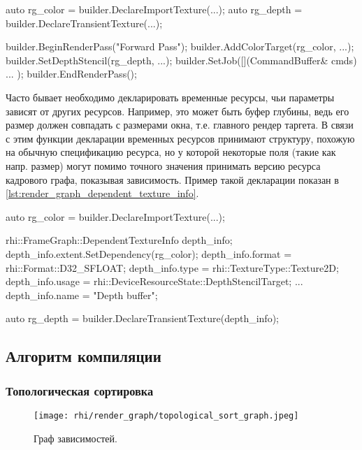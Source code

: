 \begin{minipage}[h]{0.95\textwidth}
\centering
\begin{cpp}[language=C++, caption={Пример декларации графической вершины графа.}, label={lst:render_graph_declaration}]
auto rg_color = builder.DeclareImportTexture(...);
auto rg_depth = builder.DeclareTransientTexture(...);

builder.BeginRenderPass("Forward Pass");
builder.AddColorTarget(rg_color, ...);
builder.SetDepthStencil(rg_depth, ...);
builder.SetJob([](CommandBuffer& cmds) {
    ...
});
builder.EndRenderPass();
\end{cpp}
\end{minipage}

Часто бывает необходимо декларировать временные ресурсы, чьи параметры зависят от других ресурсов. Например, это может быть буфер глубины, ведь его размер должен совпадать с размерами окна, т.е. главного рендер таргета. В связи с этим функции декларации временных ресурсов принимают структуру, похожую на обычную спецификацию ресурса, но у которой некоторые поля (такие как напр. размер) могут помимо точного значения принимать версию ресурса кадрового графа, показывая зависимость. Пример такой декларации показан в \ref{lst:render_graph_dependent_texture_info}.

\begin{minipage}[h]{0.95\textwidth}
\centering
\begin{cpp}[language=C++, caption={Пример декларации зависимых временных ресурсов.}, label={lst:render_graph_dependent_texture_info}]
auto rg_color = builder.DeclareImportTexture(...);

rhi::FrameGraph::DependentTextureInfo depth_info{};
depth_info.extent.SetDependency(rg_color);
depth_info.format = rhi::Format::D32_SFLOAT;
depth_info.type   = rhi::TextureType::Texture2D;
depth_info.usage  = rhi::DeviceResourceState::DepthStencilTarget;
...
depth_info.name   = "Depth buffer";

auto rg_depth = builder.DeclareTransientTexture(depth_info);
\end{cpp}
\end{minipage}

\subsection{Алгоритм компиляции}
\subsubsection{Топологическая сортировка}
\begin{wrapfigure}{R}{0.305\textwidth}
    \centering
    \texttt{[image: rhi/render\_graph/topological\_sort\_graph.jpeg]}
    \caption{Граф зависимостей.}
    \label{fig:render_graph_topological_sort_graph}
\end{wrapfigure}

